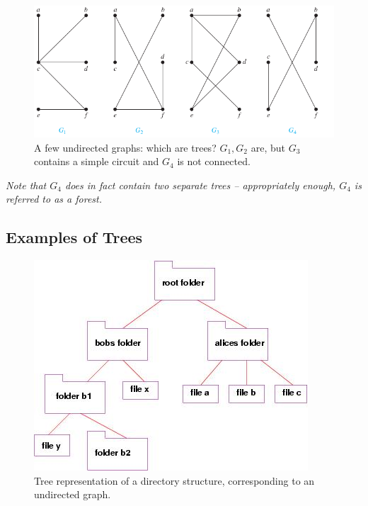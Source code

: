 \documentclass[a4paper,10pt]{report}
\begin{document}
\begin{figure}[h!]
	\begin{centering}
	\begin{center}
	\includegraphics[width=\linewidth]{./some_trees.png}
	\caption{A few undirected graphs: which are trees? $G_1, G_2$ are, but $G_3$ contains a simple circuit and $G_4$ is not connected.}
	\label{fig:some_trees}
	\end{center}
	\par\end{centering}
\end{figure}

\textit{Note that $G_4$ does in fact contain two separate trees -- appropriately enough, $G_4$ is referred to as a forest.} \\

\subsection{Examples of Trees}

\begin{figure}[H]
	\begin{centering}
	\begin{center}
	\includegraphics[width=\textwidth]{./tree.png}
	\caption{Tree representation of a directory structure, corresponding to an undirected graph.}
	\label{fig:directory}
	\end{center}
	\par\end{centering}
\end{figure}
\end{document}
